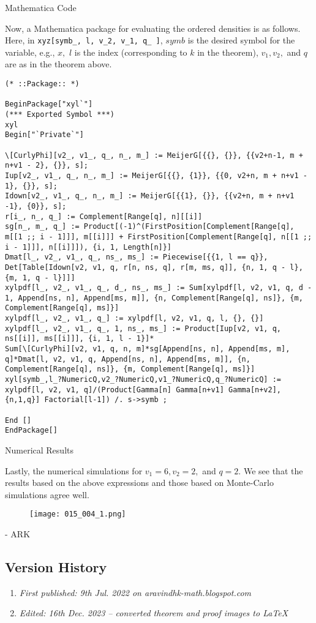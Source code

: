Mathematica Code

Now, a Mathematica package for evaluating the ordered densities is as follows. Here, in \verb!xyz[symb_, l, v_2, v_1, q_ ]!, $symb$ is the desired symbol for the variable, e.g., $x,$ $l$ is the index (corresponding to $k$ in the theorem), $v_1, v_2,$ and $q$ are as in the theorem above.

\begin{verbatim}
(* ::Package:: *)

BeginPackage["xyl`"]
(*** Exported Symbol ***)
xyl
Begin["`Private`"]

\[CurlyPhi][v2_, v1_, q_, n_, m_] := MeijerG[{{}, {}}, {{v2+n-1, m + n+v1 - 2}, {}}, s]; 
Iup[v2_, v1_, q_, n_, m_] := MeijerG[{{}, {1}}, {{0, v2+n, m + n+v1 - 1}, {}}, s]; 
Idown[v2_, v1_, q_, n_, m_] := MeijerG[{{1}, {}}, {{v2+n, m + n+v1 -1}, {0}}, s]; 
r[i_, n_, q_] := Complement[Range[q], n][[i]]
sg[n_, m_, q_] := Product[(-1)^(FirstPosition[Complement[Range[q], m[[1 ;; i - 1]]], m[[i]]] + FirstPosition[Complement[Range[q], n[[1 ;; i - 1]]], n[[i]]]), {i, 1, Length[n]}]
Dmat[l_, v2_, v1_, q_, ns_, ms_] := Piecewise[{{1, l == q}}, Det[Table[Idown[v2, v1, q, r[n, ns, q], r[m, ms, q]], {n, 1, q - l}, {m, 1, q - l}]]]
xylpdf[l_, v2_, v1_, q_, d_, ns_, ms_] := Sum[xylpdf[l, v2, v1, q, d - 1, Append[ns, n], Append[ms, m]], {n, Complement[Range[q], ns]}, {m, Complement[Range[q], ms]}]
xylpdf[l_, v2_, v1_, q_] := xylpdf[l, v2, v1, q, l, {}, {}]
xylpdf[l_, v2_, v1_, q_, 1, ns_, ms_] := Product[Iup[v2, v1, q, ns[[i]], ms[[i]]], {i, 1, l - 1}]*
Sum[\[CurlyPhi][v2, v1, q, n, m]*sg[Append[ns, n], Append[ms, m], q]*Dmat[l, v2, v1, q, Append[ns, n], Append[ms, m]], {n, Complement[Range[q], ns]}, {m, Complement[Range[q], ms]}]
xyl[symb_,l_?NumericQ,v2_?NumericQ,v1_?NumericQ,q_?NumericQ] := xylpdf[l, v2, v1, q]/(Product[Gamma[n] Gamma[n+v1] Gamma[n+v2],{n,1,q}] Factorial[l-1]) /. s->symb ;

End []
EndPackage[]
\end{verbatim}

Numerical Results

Lastly, the numerical simulations for $v_1 = 6, v_2 = 2,$ and $q = 2.$ We see that the results based on the above expressions and those based on Monte-Carlo simulations agree well.

\begin{figure}[H]
	\centering
	\texttt{[image: 015\_004\_1.png]}
\end{figure}

- ARK

\subsection{Version History}
\begin{enumerate}
	\item \emph{First published: 9th Jul. 2022 on aravindhk-math.blogspot.com}
	\item \emph{Edited: 16th Dec. 2023 -- converted theorem and proof images to \LaTeX}
\end{enumerate}


